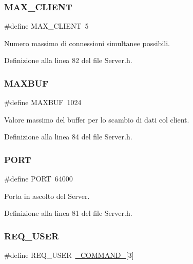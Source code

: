 \subsubsection{\texorpdfstring{MAX\_CLIENT}{MAX\_CLIENT}}
{\footnotesize\ttfamily \#define M\+A\+X\+\_\+\+C\+L\+I\+E\+NT~5}



Numero massimo di connessioni simultanee possibili. 



Definizione alla linea 82 del file Server.\+h.

\mbox{\label{a00050_ad7871643c05865c80f5d8050aead2b57}} 
\subsubsection{\texorpdfstring{MAXBUF}{MAXBUF}}
{\footnotesize\ttfamily \#define M\+A\+X\+B\+UF~1024}



Valore massimo del buffer per lo scambio di dati col client. 



Definizione alla linea 84 del file Server.\+h.

\mbox{\label{a00050_a614217d263be1fb1a5f76e2ff7be19a2}} 
\subsubsection{\texorpdfstring{PORT}{PORT}}
{\footnotesize\ttfamily \#define P\+O\+RT~64000}



Porta in ascolto del Server. 



Definizione alla linea 81 del file Server.\+h.

\mbox{\label{a00050_a60c7d807af4f8196d078b83ed9c4f45c}} 
\subsubsection{\texorpdfstring{REQ\_USER}{REQ\_USER}}
{\footnotesize\ttfamily \#define R\+E\+Q\+\_\+\+U\+S\+ER~\mbox{\hyperlink{a00050_ad7ed85b86ff98d7a5853304284acd79e}{\+\_\+\+C\+O\+M\+M\+A\+N\+D\+\_\+}}\mbox{[}3\mbox{]}}



